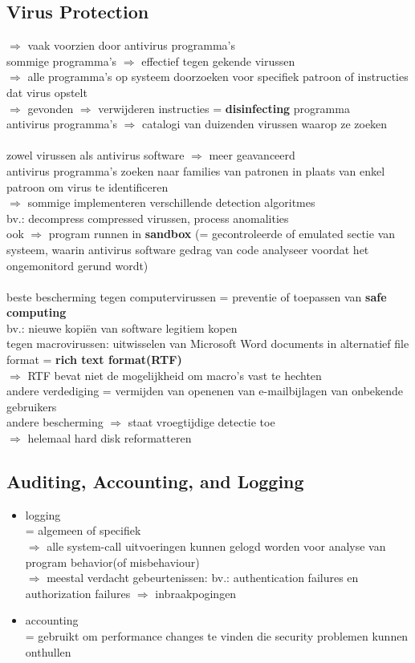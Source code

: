 \documentclass{report}
\begin{document}
\subsection{Virus Protection}
$\Rightarrow$ vaak voorzien door antivirus programma's 
\\sommige programma's $\Rightarrow$ effectief tegen gekende virussen
\\$\Rightarrow$ alle programma's op systeem doorzoeken voor specifiek patroon of instructies dat virus opstelt
\\$\Rightarrow$ gevonden $\Rightarrow$ verwijderen instructies = \textbf{disinfecting} programma
\\antivirus programma's $\Rightarrow$ catalogi van duizenden virussen waarop ze zoeken
\\
\\zowel virussen als antivirus software $\Rightarrow$ meer geavanceerd
\\antivirus programma's zoeken naar families van patronen in plaats van enkel patroon om virus te identificeren
\\$\Rightarrow$ sommige implementeren verschillende detection algoritmes
\\bv.: decompress compressed virussen, process anomalities
\\ook $\Rightarrow$ program runnen in \textbf{sandbox} (= gecontroleerde of emulated sectie van systeem, waarin antivirus software gedrag van code analyseer voordat het ongemonitord gerund wordt)
\\
\\beste bescherming tegen computervirussen = preventie of toepassen van \textbf{safe computing}
\\bv.: nieuwe kopiën van software legitiem kopen
\\tegen macrovirussen: uitwisselen van Microsoft Word documents in alternatief file format = \textbf{rich text format(RTF)}
\\$\Rightarrow$ RTF bevat niet de mogelijkheid om macro's vast te hechten
\\andere verdediging = vermijden van openenen van e-mailbijlagen van onbekende gebruikers
\\andere bescherming $\Rightarrow$ staat vroegtijdige detectie toe
\\$\Rightarrow$ helemaal hard disk reformatteren

\subsection{Auditing, Accounting, and Logging}
\begin{itemize}
\item logging
\\= algemeen of specifiek
\\$\Rightarrow$ alle system-call uitvoeringen kunnen gelogd worden voor analyse van program behavior(of misbehaviour)
\\$\Rightarrow$ meestal verdacht gebeurtenissen: bv.: authentication failures en authorization failures $\Rightarrow$ inbraakpogingen
\item accounting
\\= gebruikt om performance changes te vinden die security problemen kunnen onthullen
\end{itemize}
\end{document}
